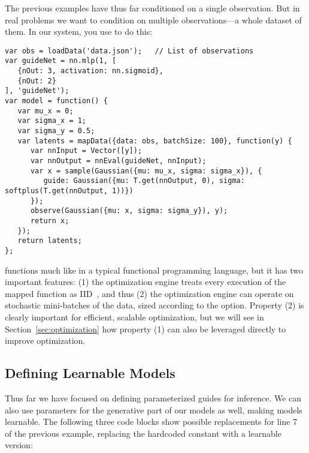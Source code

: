 The previous examples have thus far conditioned on a single observation. But in real problems we want to condition on multiple observations---a whole dataset of them.
In our system, you use  to do this:
\begin{lstlisting}
var obs = loadData('data.json');   // List of observations
var guideNet = nn.mlp(1, [
   {nOut: 3, activation: nn.sigmoid},
   {nOut: 2}
], 'guideNet');
var model = function() {
   var mu_x = 0;
   var sigma_x = 1;
   var sigma_y = 0.5;
   var latents = mapData({data: obs, batchSize: 100}, function(y) {
      var nnInput = Vector([y]);
      var nnOutput = nnEval(guideNet, nnInput);
      var x = sample(Gaussian({mu: mu_x, sigma: sigma_x}), {
         guide: Gaussian({mu: T.get(nnOutput, 0), sigma: softplus(T.get(nnOutput, 1))})
      });
      observe(Gaussian({mu: x, sigma: sigma_y}), y);
      return x;
   });
   return latents;
};
\end{lstlisting}
 functions much like  in a typical functional programming language, but it has two important features: (1) the optimization engine treats every execution of the mapped function as IID~, and thus (2) the optimization engine can operate on stochastic mini-batches of the data, sized according to the  option.
Property (2) is clearly important for efficient, scalable optimization, but we will see in Section~\ref{sec:optimization} how property (1) can also be leveraged directly to improve optimization.


\subsection{Defining Learnable Models}

Thus far we have focused on defining parameterized guides for inference.
We can also use parameters for the generative part of our models as well, making models learnable.
The following three code blocks show possible replacements for line 7 of the previous example, replacing the hardcoded constant  with a learnable version:


